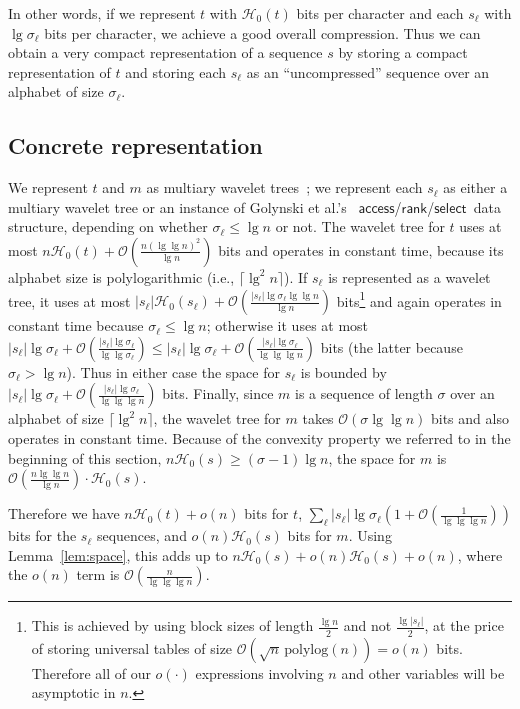 \documentclass[11pt]{article}
\newcommand{\Oh}[1]
    {\ensuremath{\mathcal{O}\left( {#1} \right)}}
\newcommand{\access}
    {\ensuremath{\mathsf{access}}}
\newcommand{\rank}
    {\ensuremath{\mathsf{rank}}}
\newcommand{\select}
    {\ensuremath{\mathsf{select}}}
\newcommand{\HH}{\mathcal{H}}
\newcommand{\Ho}{\HH_0}
\newcommand{\mapping}{\ensuremath{{m}}}
\begin{document}
In other words, if we represent $t$ with \(\Ho (t)\) bits per character
and each $s_\ell$ with \(\lg \sigma_\ell\) bits per character,
we achieve a good overall compression.
Thus we can obtain a very compact representation
of a sequence $s$ by storing a compact representation of $t$ and storing
each $s_{\ell}$ as an ``uncompressed'' sequence over an alphabet
of size $\sigma_{\ell}$.

\subsection{Concrete representation}
\label{sec:repr}

We represent $t$ and $\mapping$ as multiary wavelet trees~\cite{FMMN07};
 we represent each $s_\ell$ as either a multiary wavelet tree or an instance of
Golynski et al.'s~\cite[Thm.~2.2]{GMR06}  \access/\rank/\select\ data structure,
depending on whether \(\sigma_\ell \leq \lg n\) or not.
The wavelet tree for $t$ uses at most
\(n \Ho (t) + \Oh{\frac{n(\lg\lg n)^2}{\lg n}}\) bits and operates
in constant time, because its alphabet size is polylogarithmic
(i.e., $\lceil \lg^2 n \rceil$).
If $s_\ell$ is represented as a wavelet tree, it uses at most
\(|s_\ell| \Ho (s_\ell) + \Oh{\frac{|s_\ell|\lg \sigma_\ell \lg\lg n}{\lg n}}\) bits\footnote{This is achieved by using block sizes
of length $\frac{\lg n}{2}$ and not $\frac{\lg |s_\ell|}{2}$, at the price
of storing universal tables of size $\Oh{\sqrt{n}\,\textrm{polylog}(n)}=o(n)$ bits.
Therefore all of our $o(\cdot)$ expressions involving $n$ and other variables will be
asymptotic in $n$.}
and again operates in constant time because $\sigma_\ell \le \lg n$; otherwise it uses at most
\(|s_\ell| \lg \sigma_\ell
     + \Oh{\frac{|s_\ell| \lg \sigma_\ell}{\lg \lg \sigma_\ell}}
\leq |s_\ell| \lg \sigma_\ell
     + \Oh{\frac{|s_\ell| \lg \sigma_\ell}{\lg \lg \lg n}}\) bits
(the latter because $\sigma_\ell > \lg n$).
Thus in either case the space for $s_\ell$ is bounded by
$|s_\ell| \lg \sigma_\ell +\Oh{\frac{|s_\ell|\lg \sigma_\ell}{\lg\lg\lg n}}$ bits.
Finally, since $\mapping$ is a sequence of length $\sigma$ over an alphabet of size
$\lceil \lg^2 n \rceil$, the wavelet tree for $\mapping$ takes
$\Oh{\sigma \lg \lg n}$ bits and also operates in constant time. Because of the convexity property we referred to in the
beginning of this section, $n\Ho(s) \ge (\sigma-1)\lg n$, the space for 
$\mapping$ is
$\Oh{\frac{n\lg\lg n}{\lg n}} \cdot \Ho(s)$.

Therefore we have $n\Ho(t)+o(n)$ bits for $t$, 
$\sum_\ell |s_\ell| \lg \sigma_\ell \left(1+\Oh{\frac{1}{\lg\lg\lg n}}\right)$
bits for the $s_\ell$ sequences, and $o(n)\Ho(s)$ bits for $\mapping$. Using
Lemma~\ref{lem:space}, this adds up to
$n\Ho(s) + o(n)\Ho(s) + o(n)$, 
where the $o(n)$ term is $\Oh{\frac{n}{\lg\lg\lg n}}$.
\end{document}

